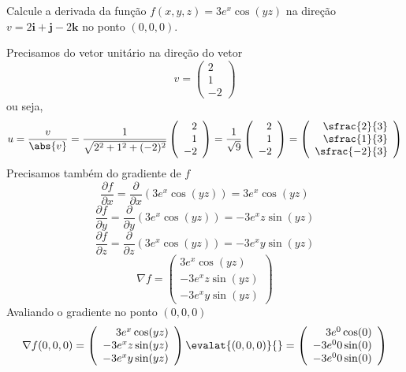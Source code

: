 \documentclass[a4paper,12pt,fleqn]{article}
\newcommand{\D}[2]{\frac{\partial {#1}}{\partial {#2}}}
\newcommand{\veci}{\bm{i}}
\newcommand{\vecj}{\bm{j}}
\newcommand{\veck}{\bm{k}}
\begin{document}
Calcule a derivada da função
\(
  f(x, y, z) = 3e^x\cos(yz)
\)
na direção
\(
  v = 2\veci + \vecj -2\veck
\)
no ponto
\((0, 0, 0)\).

\begin{answer}
  Precisamos do vetor unitário na direção do vetor
  \[
    v = \left(\begin{array}{r} 2 \\ 1 \\ -2 \end{array}\right)
  \]
  ou seja,
  \[
    u
    = \frac{v}{\abs{v}}
    = \frac{1}{\sqrt{2^2+1^2+(-2)^2}}\left(\begin{array}{r} 2 \\ 1 \\ -2 \end{array}\right)
    = \frac{1}{\sqrt{9}}\left(\begin{array}{r} 2 \\ 1 \\ -2 \end{array}\right)
    = \left(\begin{array}{r} \sfrac{2}{3} \\ \sfrac{1}{3} \\ \sfrac{-2}{3} \end{array}\right)
  \]
  Precisamos também do gradiente de $f$
  \[
    \D{f}{x}
    = \D{}{x}\left(3e^x\cos(yz)\right)
    = 3e^x\cos(yz)
  \]
  \[
    \D{f}{y}
    = \D{}{y}\left(3e^x\cos(yz)\right)
    = -3e^xz\sin(yz)
  \]
  \[
    \D{f}{z}
    = \D{}{z}\left(3e^x\cos(yz)\right)
    = -3e^xy\sin(yz)
  \]
  \[
    \nabla f = \left(\begin{array}{r}
      3e^x\cos(yz) \\
      -3e^xz\sin(yz) \\
      -3e^xy\sin(yz)
    \end{array}\right)
  \]
  Avaliando o gradiente no ponto \((0, 0, 0)\)
  \[
    \nabla f(0, 0, 0)
    = \left(\begin{array}{r}
      3e^x\cos(yz) \\
      -3e^xz\sin(yz) \\
      -3e^xy\sin(yz)
    \end{array}\right)\evalat{(0, 0, 0)}{}
    = \left(\begin{array}{r}
      3e^0\cos(0) \\
      -3e^00\sin(0) \\
      -3e^00\sin(0)
    \end{array}\right)
\]
\end{answer}
\end{document}
